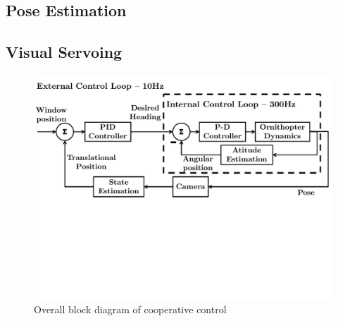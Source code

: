 \documentclass{aamas2013}
\begin{document}
\subsection{Pose Estimation}

\subsection{Visual Servoing}

\begin{figure}[tb]
\centering
\includegraphics[width=\linewidth]{figures/block_diagrams.pdf}
\caption{Overall block diagram of cooperative control}
\label{fig:block_diagram}
\end{figure}
\end{document}
